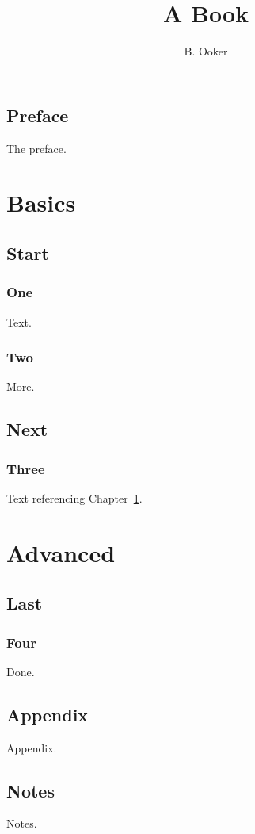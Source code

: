 \documentclass[twoside,11pt]{book}
\begin{document}
\frontmatter\title{A Book}\author{B. Ooker}\maketitle
\chapter*{Preface}The preface.\tableofcontents
\mainmatter
\part{Basics}
\chapter{Start}\section{One}Text.\section{Two}More.
\chapter{Next}\section{Three}Text referencing Chapter~\ref{ch:last}.
\part{Advanced}
\chapter{Last}\label{ch:last}\section{Four}Done.
\appendix\chapter{Appendix}Appendix.
\backmatter\chapter{Notes}Notes.
\printindex
\end{document}
